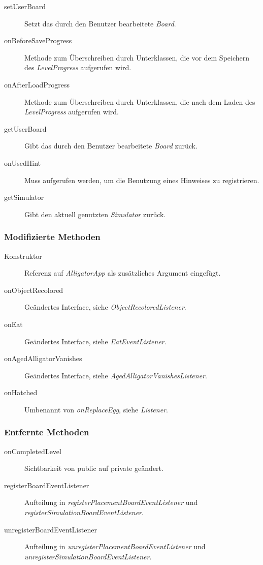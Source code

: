 \begin{description}
\item[setUserBoard]
Setzt das durch den Benutzer bearbeitete \emph{Board}.

\item[onBeforeSaveProgress]
Methode zum Überschreiben durch Unterklassen, die vor dem Speichern des \emph{LevelProgress} aufgerufen wird.

\item[onAfterLoadProgress]
Methode zum Überschreiben durch Unterklassen, die nach dem Laden des \emph{LevelProgress} aufgerufen wird.

\item[getUserBoard]
Gibt das durch den Benutzer bearbeitete \emph{Board} zurück.

\item[onUsedHint]
Muss aufgerufen werden, um die Benutzung eines Hinweises zu registrieren.

\item[getSimulator]
Gibt den aktuell genutzten \emph{Simulator} zurück.
\end{description}

\subsubsection{Modifizierte Methoden}
\begin{description}
\item[Konstruktor]
Referenz auf \emph{AlligatorApp} als zusätzliches Argument eingefügt.

\item[onObjectRecolored]
Geändertes Interface, siehe \emph{ObjectRecoloredListener}.

\item[onEat]
Geändertes Interface, siehe \emph{EatEventListener}.

\item[onAgedAlligatorVanishes]
Geändertes Interface, siehe \emph{AgedAlligatorVanishesListener}.

\item[onHatched]
Umbenannt von \emph{onReplaceEgg}, siehe \emph{Listener}.
\end{description}

\subsubsection{Entfernte Methoden}
\begin{description}
\item[onCompletedLevel]
Sichtbarkeit von public auf private geändert.

\item[registerBoardEventListener]
Aufteilung in \emph{registerPlacementBoardEventListener} und \emph{registerSimulationBoardEventListener}.

\item[unregisterBoardEventListener]
Aufteilung in \emph{unregisterPlacementBoardEventListener} und \emph{unregisterSimulationBoardEventListener}.

\end{description}


